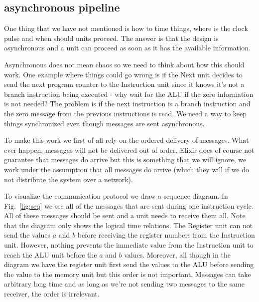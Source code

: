 \documentclass[a4paper,11pt]{article}
\begin{document}
\subsection*{asynchronous pipeline}

One thing that we have not mentioned is how to time things, where is
the clock pulse and when should units proceed. The answer is that the
design is asynchronous and a unit can proceed as soon as it has the
available information.

Asynchronous does not mean chaos so we need to think about how this
should work. One example where things could go wrong is if the Next
unit decides to send the next program counter to the Instruction unit
since it knows it's not a branch instruction being executed - why wait
for the ALU if the zero information is not needed? The problem is if
the next instruction is a branch instruction and the zero message from
the previous instructions is read. We need a way to keep things
synchronized even though messages are sent asynchronous. 

To make this work we first of all rely on the ordered delivery of
messages. What ever happen, messages will not be delivered out of
order. Elixir does of course not guarantee that messages do arrive but
this is something that we will ignore, we work under the assumption
that all messages do arrive (which they will if we do not distribute
the system over a network).

To visualize the communication protocol we draw a sequence diagram. In
Fig.~\ref{fig:seq} we see all of the messages that are sent during one
instruction cycle. All of these messages should be sent and a unit
needs to receive them all. Note that the diagram only shows the
logical time relations. The Register unit can not send the values $a$
and $b$ before receiving the register numbers from the Instruction
unit. However, nothing prevents the immediate value from the
Instruction unit to reach the ALU unit before the $a$ and $b$
values. Moreover, all though in the diagram we have the register unit
first send the values to the ALU before sending the value to the
memory unit but this order is not important. Messages can take
arbitrary long time and as long as we're not sending two messages to
the same receiver, the order is irrelevant. 
\end{document}
